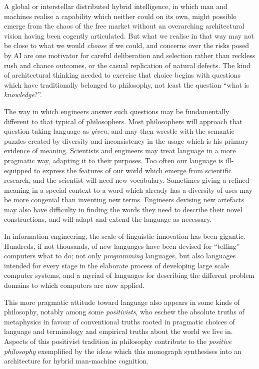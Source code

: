A global or interstellar distributed hybrid intelligence, in which man and machines realise a capability which neither could on its own, might possible emerge from the chaos of the free market without an overarching architectural vision having been cogently articulated.
But what we realise in that way may not be close to what we would {\it choose} if we could, and concerns over the risks posed by AI are one motivator for careful deliberation and selection rather than reckless rush and chance outcomes, or the casual replication of natural defects.
The kind of architectural thinking needed to exercise that choice begins with questions which have traditionally belonged to philosophy, not least the question ``what is {\it knowledge}?''.

The way in which engineers answer such questions may be fundamentally different to that typical of philosophers.
Most philosophers will approach that question taking language as {\it given}, and may then wrestle with the semantic puzzles created by diversity and inconsistency in the usage which is his primary evidence of meaning.
Scientists and engineers may treat language in a more pragmatic way, adapting it to their purposes.
Too often our language is ill-equipped to express the features of our world which emerge from scientific research, and the scientist will need new vocabulary.
Sometimes giving a refined meaning in a special context to a word which already has a diversity of uses may be more congenial than inventing new terms.
Engineers devising new artefacts may also have difficulty in finding the words they need to describe their novel constructions, and will adapt and extend the language as necessary.

In information engineering, the scale of linguistic innovation has been gigantic.
Hundreds, if not thousands, of new languages have been devised for ``telling'' computers what to do; not only {\it programming} languages, but also languages intended for every stage in the elaborate process of developing large scale computer systems, and a myriad of languages for describing the different problem domains to which computers are now applied.

This more pragmatic attitude toward language also appears in some kinds of philosophy, notably among some {\it positivists}, who eschew the absolute truths of metaphysics in favour of conventional truths rooted in pragmatic choices of language and terminology and empirical truths about the world we live in.
Aspects of this positivist tradition in philosophy contribute to the {\it positive philosophy} exemplified by the ideas which this monograph synthesises into an architecture for hybrid man-machine cognition.
 
\mainmatter
